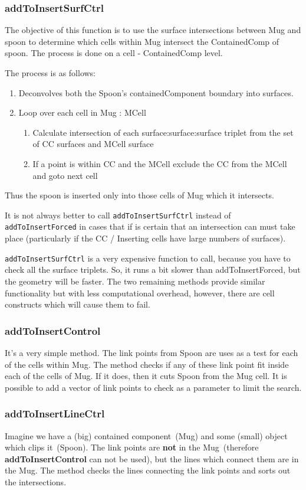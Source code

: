 \subsubsection{addToInsertSurfCtrl}

The objective of this function is to use the surface intersections between Mug and spoon to determine which 
cells within Mug intersect the ContainedComp of spoon. The process is done on a cell - ContainedComp level. 

The process is as follows:
\begin{enumerate}

\item{Deconvolves both the Spoon's containedComponent boundary into surfaces.}
\item{Loop over each cell in Mug : MCell}
  \begin{enumerate}
  \item{Calculate intersection of each surface:surface:surface triplet from the set of CC surfaces and MCell surface}
  \item{If a point is within CC and the MCell exclude the CC from the
    MCell and goto next cell}
  \end{enumerate}
\end{enumerate}
   
Thus the spoon is inserted only into those cells of Mug which it intersects.

It is not always better to call {\tt addToInsertSurfCtrl} instead of
{\tt addToInsertForced} in cases that if is certain that an
intersection can must take place (particularly if the CC / Inserting
cells have large numbers of surfaces).

{\tt addToInsertSurfCtrl} is a very expensive function to call,
because you have to check all the surface triplets. So, it runs a bit
slower than addToInsertForced, but the geometry will be faster.  The
two remaining methods provide similar functionality but with less
computational overhead, however, there are cell constructs which will
cause them to fail.

\subsubsection{addToInsertControl}

It's a very simple method. The link points from Spoon are uses as a test for each of the cells within Mug. 
The method checks if any of these link point fit inside each of the cells of Mug. If it does, then it cuts Spoon from the Mug cell.
It is possible to add a vector of link points to check as a parameter to limit the search.

\subsubsection{addToInsertLineCtrl}

Imagine we have a (big) contained component~(Mug) and some (small)
object which clips it~(Spoon). The link points are {\bf not} in the
Mug~(therefore {\bf addToInsertControl} can not be used), but the
lines which connect them are in the Mug.  The method checks the lines
connecting the link points and sorts out the intersections.
